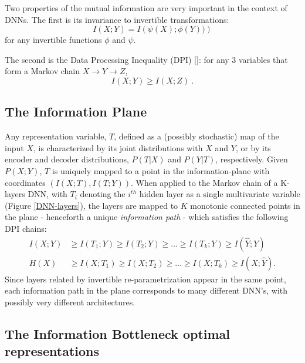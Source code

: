 \documentclass[11pt]{article}
\begin{document}
Two properties of the mutual information are very important in the context of DNNs. 
The first is its invariance to invertible transformations:
\begin{equation}
\label{eqn:invariance}
I\left(X;Y\right)=I\left(\psi(X);\phi(Y))\right)
\end{equation}
for any invertible functions $\phi$ and $\psi$.
 
The second is the Data Processing Inequality (DPI) [\citet{Cover:2006}]: 
for any 3 variables that form a Markov chain $X\rightarrow Y \rightarrow Z$,
\begin{equation}
I\left(X;Y\right) \ge I(X;Z) ~.
\end{equation}
 

\subsection{The Information Plane} 
\label{I-Plane}
Any representation variable, $T$, defined as a (possibly stochastic) map of the input $X$, is characterized by its joint distributions with $X$ and $Y$, or by its encoder and decoder distributions, $P(T|X)$ and  $P(Y|T)$, respectively. 
Given $P(X;Y)$, $T$ is uniquely mapped to a point in the information-plane with coordinates 
$\left(I(X;T),I(T;Y)\right)$. When applied to the Markov chain of a K-layers DNN, with $T_i$ denoting the $i^{th}$ hidden layer as a single multivariate variable (Figure \ref{DNN-layers}), the layers are mapped to $K$ monotonic connected points in the plane - henceforth  a unique \textit{information path} -  which satisfies the following DPI chains:
\begin{align}
I(X;Y) & \ge I(T_1;Y) \ge I(T_2;Y) \ge ...\ge I(T_k;Y) \ge I(\hat{Y};Y)\\
H(X) & \ge I(X;T_1) \ge I(X;T_2) \ge ... \ge I(X;T_k) \ge I(X;\hat{Y}) .
 \label{DPI-1}
\end{align}
Since layers related by invertible re-parametrization appear in the same point, each information path in the plane corresponds to many different DNN's, with possibly very different architectures.

\subsection{The Information Bottleneck optimal representations}
\label{sec:IB}
\end{document}
